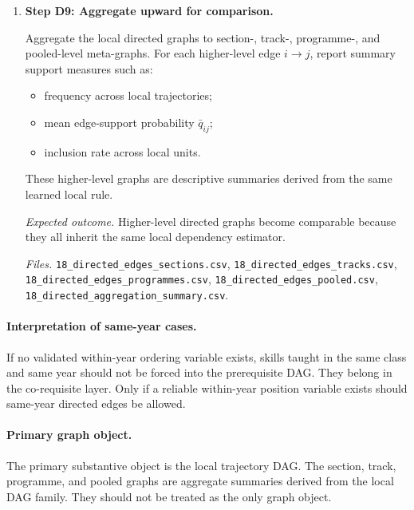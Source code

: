 \begin{enumerate}
    \textit{Expected outcome.}
    One directed dependency graph is produced per trajectory unit, plus an optional same-time
    co-requisite layer.

    \textit{Files.}
    \texttt{17\_directed\_edges\_trajectories.csv},
    \texttt{17\_corequisite\_edges\_trajectories.csv},
    \texttt{17\_directed\_graph\_summary.csv}.

    \item \textbf{Step D9: Aggregate upward for comparison.}

    Aggregate the local directed graphs to section-, track-, programme-, and pooled-level
    meta-graphs. For each higher-level edge $i \rightarrow j$, report summary support measures such
    as:
    \begin{itemize}
        \item frequency across local trajectories;
        \item mean edge-support probability $\bar q_{ij}$;
        \item inclusion rate across local units.
    \end{itemize}
    These higher-level graphs are descriptive summaries derived from the same learned local rule.

    \textit{Expected outcome.}
    Higher-level directed graphs become comparable because they all inherit the same local
    dependency estimator.

    \textit{Files.}
    \texttt{18\_directed\_edges\_sections.csv},
    \texttt{18\_directed\_edges\_tracks.csv},
    \texttt{18\_directed\_edges\_programmes.csv},
    \texttt{18\_directed\_edges\_pooled.csv},
    \texttt{18\_directed\_aggregation\_summary.csv}.

\end{enumerate}

\paragraph{Interpretation of same-year cases.}
If no validated within-year ordering variable exists, skills taught in the same class and same
year should not be forced into the prerequisite DAG. They belong in the co-requisite layer.
Only if a reliable within-year position variable exists should same-year directed edges be allowed.

\paragraph{Primary graph object.}
The primary substantive object is the local trajectory DAG. The section, track, programme, and
pooled graphs are aggregate summaries derived from the local DAG family. They should not be
treated as the only graph object.

